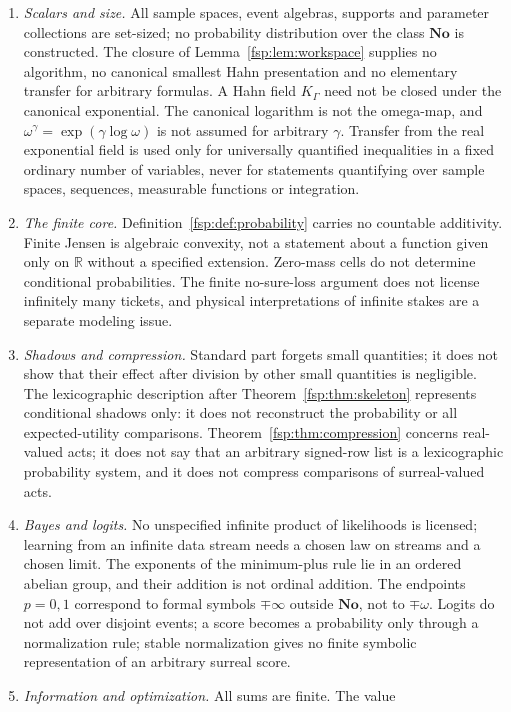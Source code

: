 \documentclass[11pt,a4paper]{article}
\numberwithin{equation}{section}
\theoremstyle{definition}
\theoremstyle{remark}
\newcommand{\R}{\mathbb R}
\newcommand{\No}{\mathbf{No}}
\begin{document}
\begin{enumerate}[label=(N\arabic*),leftmargin=3.2em]
\item \emph{Scalars and size.} All sample spaces, event algebras, supports and
parameter collections are set-sized; no probability distribution over the
class $\No$ is constructed. The closure of Lemma~\ref{fsp:lem:workspace}
supplies no algorithm, no canonical smallest
Hahn presentation and no elementary transfer for arbitrary formulas. A Hahn
field $K_\Gamma$ need not be closed under the canonical exponential. The
canonical logarithm is not the omega-map, and $\omega^\gamma=\exp(\gamma\log\omega)$
is not assumed for arbitrary $\gamma$. Transfer from the real exponential field
is used only for universally quantified inequalities in a fixed ordinary number
of variables, never for statements quantifying over sample spaces, sequences,
measurable functions or integration.
\item \emph{The finite core.} Definition~\ref{fsp:def:probability} carries no countable additivity.
Finite Jensen is algebraic convexity, not a statement about a function given
only on $\R$ without a specified extension. Zero-mass cells do not determine
conditional probabilities. The finite no-sure-loss argument does not license
infinitely many tickets, and physical interpretations of infinite stakes are a
separate modeling issue.
\item \emph{Shadows and compression.} Standard part forgets small quantities;
it does not show that their effect after division by other small quantities is
negligible. The lexicographic description after
Theorem~\ref{fsp:thm:skeleton} represents conditional shadows only: it does
not reconstruct the probability or all expected-utility comparisons.
Theorem~\ref{fsp:thm:compression} concerns real-valued acts; it does not say
that an arbitrary signed-row list is a lexicographic probability system, and
it does not compress comparisons of surreal-valued acts.
\item \emph{Bayes and logits.} No unspecified infinite product of likelihoods is
licensed; learning from an infinite data stream needs a chosen law on streams
and a chosen limit. The exponents of the minimum-plus rule lie in an ordered
abelian group, and their addition is not ordinal addition. The endpoints
$p=0,1$ correspond to formal symbols $\mp\infty$ outside $\No$, not to
$\mp\omega$. Logits do not add over disjoint events; a score becomes a
probability only through a normalization rule; stable normalization gives no
finite symbolic representation of an arbitrary surreal score.
\item \emph{Information and optimization.} All sums are finite. The value

\end{enumerate}
\end{document}
